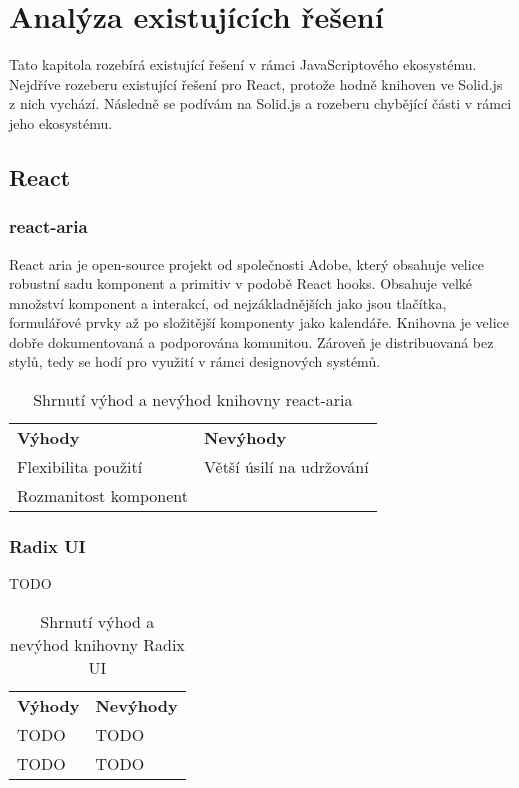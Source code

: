 \chapter{Analýza existujících řešení}

Tato kapitola rozebírá existující řešení v rámci JavaScriptového ekosystému.
Nejdříve rozeberu existující řešení pro React, protože hodně knihoven ve Solid.js z nich vychází.
Následně se podívám na Solid.js a rozeberu chybějící části v rámci jeho ekosystému.

\section{React}

\subsection{react-aria}

React aria je open-source projekt od společnosti Adobe, který obsahuje velice robustní sadu komponent a primitiv v podobě React hooks.
Obsahuje velké množství komponent a interakcí, od nejzákladnějších jako jsou tlačítka, formulářové prvky až po složitější komponenty jako kalendáře.
Knihovna je velice dobře dokumentovaná a podporována komunitou.
Zároveň je distribuovaná bez stylů, tedy se hodí pro využití v rámci designových systémů.

\begin{table}[ht]
    \begin{ctucolortab}
        \begin{tabularx}{\textwidth}{Y Y}
            \bfseries \textcolor{OK}{Výhody} & \bfseries \textcolor{NOT_OK}{Nevýhody} \\\Midrule{}
            Flexibilita použití              & Větší úsilí na udržování               \\
            Rozmanitost komponent
        \end{tabularx}
    \end{ctucolortab}
    \caption{Shrnutí výhod a nevýhod knihovny react-aria}
\end{table}

\subsection{Radix UI}

TODO

\begin{table}[ht]
    \begin{ctucolortab}
        \begin{tabularx}{\textwidth}{Y Y}
            \bfseries \textcolor{OK}{Výhody} & \bfseries \textcolor{NOT_OK}{Nevýhody} \\\Midrule{}
            TODO                             & TODO                                   \\
            TODO                             & TODO
        \end{tabularx}
    \end{ctucolortab}
    \caption{Shrnutí výhod a nevýhod knihovny Radix UI}
\end{table}

